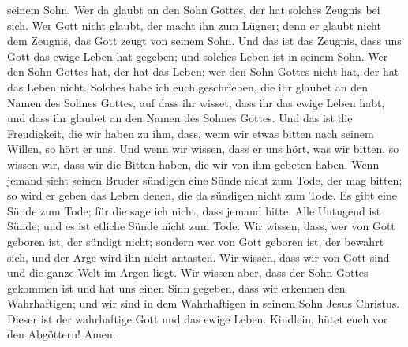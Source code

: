 seinem Sohn.  Wer da glaubt an den Sohn Gottes, der hat
solches Zeugnis bei sich. Wer Gott nicht glaubt, der macht ihn zum
Lügner; denn er glaubt nicht dem Zeugnis, das Gott zeugt von seinem
Sohn.  Und das ist das Zeugnis, dass uns Gott das ewige
Leben hat gegeben; und solches Leben ist in seinem Sohn. 
Wer den Sohn Gottes hat, der hat das Leben; wer den Sohn Gottes nicht
hat, der hat das Leben nicht.  Solches habe ich euch
geschrieben, die ihr glaubet an den Namen des Sohnes Gottes, auf dass
ihr wisset, dass ihr das ewige Leben habt, und dass ihr glaubet an den
Namen des Sohnes Gottes.  Und das ist die Freudigkeit, die
wir haben zu ihm, dass, wenn wir etwas bitten nach seinem Willen, so
hört er uns.  Und wenn wir wissen, dass er uns hört, was
wir bitten, so wissen wir, dass wir die Bitten haben, die wir von ihm
gebeten haben.  Wenn jemand sieht seinen Bruder sündigen
eine Sünde nicht zum Tode, der mag bitten; so wird er geben das Leben
denen, die da sündigen nicht zum Tode. Es gibt eine Sünde zum Tode; für
die sage ich nicht, dass jemand bitte.  Alle Untugend ist
Sünde; und es ist etliche Sünde nicht zum Tode.  Wir
wissen, dass, wer von Gott geboren ist, der sündigt nicht; sondern wer
von Gott geboren ist, der bewahrt sich, und der Arge wird ihn nicht
antasten.  Wir wissen, dass wir von Gott sind und die ganze
Welt im Argen liegt.  Wir wissen aber, dass der Sohn Gottes
gekommen ist und hat uns einen Sinn gegeben, dass wir erkennen den
Wahrhaftigen; und wir sind in dem Wahrhaftigen in seinem Sohn Jesus
Christus. Dieser ist der wahrhaftige Gott und das ewige Leben.
 Kindlein, hütet euch vor den Abgöttern! Amen.
